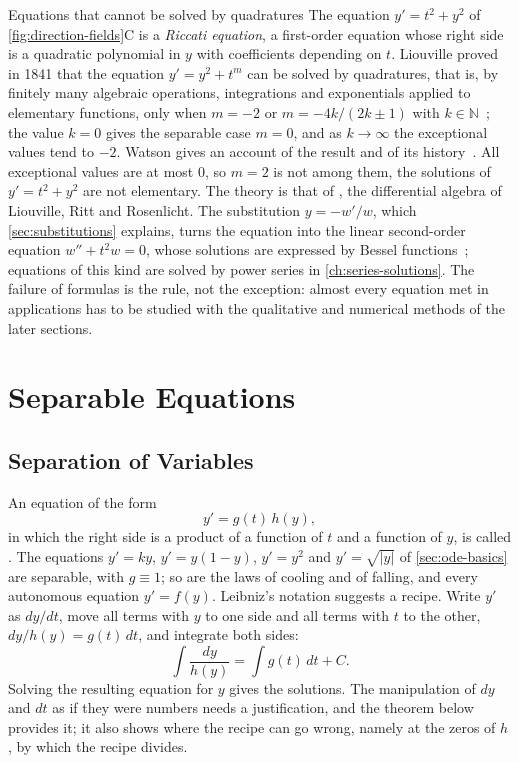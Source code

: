 \begin{note}{Equations that cannot be solved by quadratures}
The equation $y'=t^2+y^2$ of \cref{fig:direction-fields}C is a \emph{Riccati equation}, a first-order equation whose right side is a quadratic polynomial in $y$ with coefficients depending on $t$. Liouville proved in 1841 that the equation $y'=y^2+t^m$ can be solved by quadratures, that is, by finitely many algebraic operations, integrations and exponentials applied to elementary functions, only when $m=-2$ or $m=-4k/(2k\pm1)$ with $k\in\mathbb N$~\cite{liouville1841}; the value $k=0$ gives the separable case $m=0$, and as $k\to\infty$ the exceptional values tend to $-2$. Watson gives an account of the result and of its history~\cite[Chap.~IV]{watson1944}. All exceptional values are at most $0$, so $m=2$ is not among them, the solutions of $y'=t^2+y^2$ are not elementary. The theory is that of , the differential algebra of Liouville, Ritt and Rosenlicht. The substitution $y=-w'/w$, which \cref{sec:substitutions} explains, turns the equation into the linear second-order equation $w''+t^2w=0$, whose solutions are expressed by Bessel functions~\cite[Chap.~IV]{watson1944}; equations of this kind are solved by power series in \cref{ch:series-solutions}. The failure of formulas is the rule, not the exception: almost every equation met in applications has to be studied with the qualitative and numerical methods of the later sections.
\end{note}

\section{Separable Equations}
\label{sec:separable}

\subsection{Separation of Variables}

An equation of the form
\begin{equation}
y'=g(t)\,h(y),
\label{eq:separable}
\end{equation}
in which the right side is a product of a function of $t$ and a function of $y$, is called . The equations $y'=ky$, $y'=y(1-y)$, $y'=y^2$ and $y'=\sqrt{|y|}$ of \cref{sec:ode-basics} are separable, with $g\equiv1$; so are the laws of cooling and of falling, and every autonomous equation $y'=f(y)$. Leibniz's notation suggests a recipe. Write $y'$ as $dy/dt$, move all terms with $y$ to one side and all terms with $t$ to the other, $dy/h(y)=g(t)\,dt$, and integrate both sides:
\[
\int\frac{dy}{h(y)}=\int g(t)\,dt+C .
\]
Solving the resulting equation for $y$ gives the solutions. The manipulation of $dy$ and $dt$ as if they were numbers needs a justification, and the theorem below provides it; it also shows where the recipe can go wrong, namely at the zeros of $h$, by which the recipe divides.

